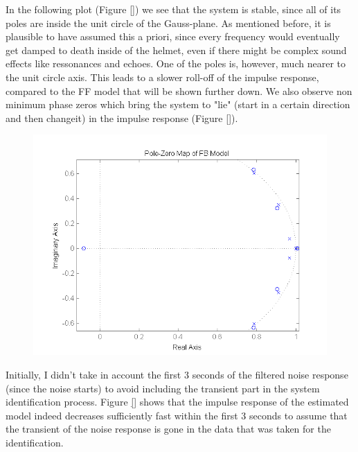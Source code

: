 In the following plot (Figure \ref{}) we see that the system is stable, since all of its poles are inside the unit circle of the Gauss-plane. As mentioned before, it is plausible to have assumed this a priori, since every frequency would eventually get damped to death inside of the helmet, even if there might be complex sound effects like ressonances and echoes. One of the poles is, however, much nearer to the unit circle axis. This leads to a slower roll-off of the impulse response, compared to the FF model that will be shown further down. We also observe non minimum phase zeros which bring the system to "lie" (start in a certain direction and then changeit) in the impulse response (Figure \ref{}).

\begin{figure}[H]
\centering
\includegraphics[width=1.0\textwidth]{pics/pole_FB}
\caption{}
\label{pic:}
\end{figure}

Initially, I didn't take in account the first 3 seconds of the filtered noise response (since the noise starts) to avoid including the transient part in the system identification process.  Figure \ref{} shows that the impulse response of the estimated model indeed decreases sufficiently fast within the first 3 seconds to assume that the transient of the noise response is gone in the data that was taken for the identification.

